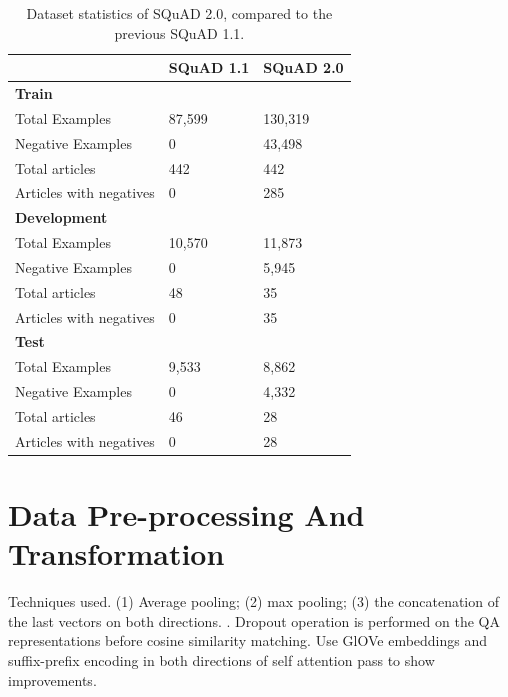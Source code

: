 \documentclass[a4paper,12pt]{report}
\begin{document}
		\begin{table}[h!]
		              \centering
		                \begin{tabular}{|l|l|l|}
		                    \hline
		                     & SQuAD 1.1 &  SQuAD 2.0 \\
		                    \hline
		                    \textbf{Train} & & \\
		                        Total Examples & 87,599 &  130,319 \\
		                        Negative Examples & 0 & 43,498 \\
		                        Total articles & 442 & 442 \\
		                        Articles with negatives & 0 & 285 \\
		                    \hline
		                    \textbf{Development} & & \\
		                        Total Examples & 10,570 &  11,873 \\
		                        Negative Examples & 0 & 5,945 \\
		                        Total articles & 48 & 35 \\
		                        Articles with negatives & 0 & 35 \\
		                    \hline
		                    \textbf{Test} &  & \\
		                        Total Examples & 9,533 & 8,862 \\
		                        Negative Examples & 0 & 4,332 \\
		                        Total articles & 46 & 28 \\
		                        Articles with negatives & 0 & 28 \\
		                    \hline
		                \end{tabular}
		                \caption{Dataset statistics of SQuAD 2.0, compared to the previous SQuAD 1.1\citep{dataset}.}\label{datasetDescription}
		 \end{table}

    \section{Data Pre-processing And Transformation}\label{c32}
    Techniques used.
    (1) Average pooling; (2) max pooling; (3) the concatenation of the last vectors on both directions. . Dropout operation is performed on the QA representations before cosine similarity matching. Use GlOVe embeddings and suffix-prefix encoding in both directions of self attention pass to show improvements. 
\end{document}
